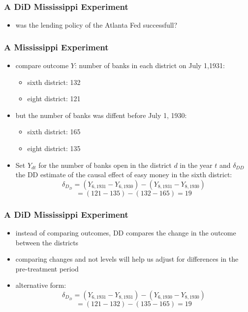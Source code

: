 \documentclass{beamer}
\begin{document}
\begin{frame}
\frametitle{A DiD Mississippi Experiment}
\begin{itemize}
	\item was the lending policy of the Atlanta Fed successfull?
	
\end{itemize}

\end{frame}
\begin{frame}
\frametitle{A Mississippi Experiment}
\begin{itemize}
	\item compare outcome $Y$: number of banks in each district on July 1,1931:
		\begin{itemize}
			\item sixth district: 132
			\item eight district: 121
		\end{itemize}
	\item but the number of banks was diffent before July 1, 1930:
		\begin{itemize}
			\item sixth district: 165
			\item eight district: 135
		\end{itemize}
	\item Set $Y_{dt}$ for the number of banks open in the district $d$ in the year $t$ and $\delta_{DD}$ the DD estimate of the causal effect of easy money in the sixth district:
	$$\delta_D_D = (Y_{6,1931} - Y_{6,1930}) - (Y_{8,1931} - Y_{8,1930}) $$
	$$ = (121-135) - (132-165) = 19$$
	
\end{itemize}

\end{frame}
\begin{frame}
\frametitle{A DiD Mississippi Experiment}
\begin{itemize}
	\item instead of comparing outcomes, DD compares the change in the outcome between the districts
	\item comparing changes and not levels will help us adjust for differences in the pre-treatment period
	\item alternative form:
	$$\delta_D_D = (Y_{6,1931} - Y_{8,1931}) - (Y_{6,1930} - Y_{8,1930}) $$
	$$ = (121-132) - (135 - 165) = 19$$
	
\end{itemize}

\end{frame}
\end{document}
